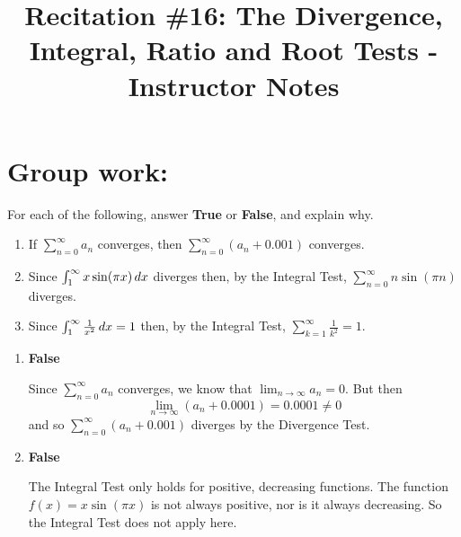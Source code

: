 \documentclass[handout,instructornotes]{ximera}
\title{Recitation \#16: The Divergence, Integral, Ratio and Root Tests - Instructor Notes}
\begin{document}
\begin{abstract}		\end{abstract}
\maketitle












\section{Group work:}



\begin{problem}
For each of the following, answer {\bf True} or {\bf False}, and explain why.
	\begin{enumerate}
	
	\item  If $\sum_{n=0}^\infty a_n$ converges, then $\sum_{n=0}^\infty (a_n + 0.001)$ converges.
	
	\item  Since $\int_1^\infty x \sin(\pi x) \,d x$ diverges then, by the Integral Test, $\sum_{n=0}^\infty n \sin(\pi n)$ diverges.
	
	\item  Since $\int_1^\infty \frac{1}{x^2} \,d x = 1$ then, by the Integral Test, $\sum_{k=1}^\infty \frac{1}{k^2} = 1$.  
	
	\end{enumerate}
	
	\begin{freeResponse}
		\begin{enumerate}
		
		\item  {\bf False}
		
		Since $\sum_{n=0}^\infty a_n$ converges, we know that $\lim_{n \to \infty} a_n = 0$.  
		But then 
			\[
			\lim_{n \to \infty} (a_n + 0.0001) = 0.0001 \neq 0
			\]
		and so $\sum_{n=0}^\infty (a_n + 0.001)$ diverges by the Divergence Test.
		
		
		
		\item  {\bf False}
		
		The Integral Test only holds for positive, decreasing functions.  
		The function $f(x)= x \sin(\pi x)$ is not always positive, nor is it always decreasing.  
		So the Integral Test does not apply here.
		

\end{enumerate}
\end{freeResponse}
\end{problem}
\end{document}
